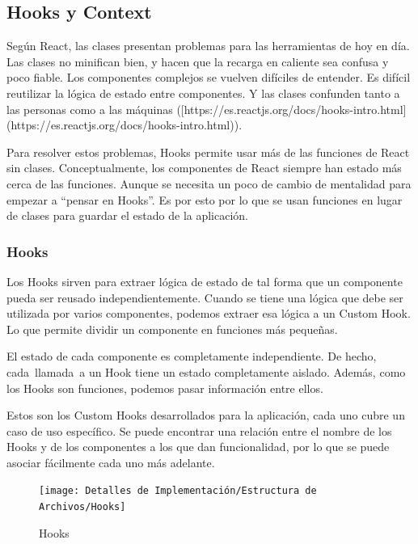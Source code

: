 \documentclass[12pt,twoside,titlepage]{report}
\begin{document}
\subsection{Hooks y Context}

Según React, las clases presentan problemas para las herramientas de hoy en día. Las clases no minifican bien, y hacen que la recarga en caliente sea confusa y poco fiable. Los componentes complejos se vuelven difíciles de entender. Es difícil reutilizar la lógica de estado entre componentes. Y las clases confunden tanto a las personas como a las máquinas ([https://es.reactjs.org/docs/hooks-intro.html](https://es.reactjs.org/docs/hooks-intro.html)).

Para resolver estos problemas, Hooks permite usar más de las funciones de React sin clases. Conceptualmente, los componentes de React siempre han estado más cerca de las funciones. Aunque se necesita un poco de cambio de mentalidad para empezar a “pensar en Hooks”. Es por esto por lo que se usan funciones en lugar de clases para guardar el estado de la aplicación.

\subsubsection{Hooks}

Los Hooks sirven para extraer lógica de estado de tal forma que un componente pueda ser reusado independientemente. Cuando se tiene una lógica que debe ser utilizada por varios componentes, podemos extraer esa lógica a un Custom Hook. Lo que permite dividir un componente en funciones más pequeñas.

El estado de cada componente es completamente independiente. De hecho, cada llamada a un Hook tiene un estado completamente aislado. Además, como los Hooks son funciones, podemos pasar información entre ellos.

Estos son los Custom Hooks desarrollados para la aplicación, cada uno cubre un caso de uso específico. Se puede encontrar una relación entre el nombre de los Hooks y de los componentes a los que dan funcionalidad, por lo que se puede asociar fácilmente cada uno más adelante.

\begin{figure}[H]
    \centering
    \texttt{[image: Detalles de Implementación/Estructura de Archivos/Hooks]}
    \label{fig:Hooks}
    \caption{Hooks}
\end{figure}
\end{document}

